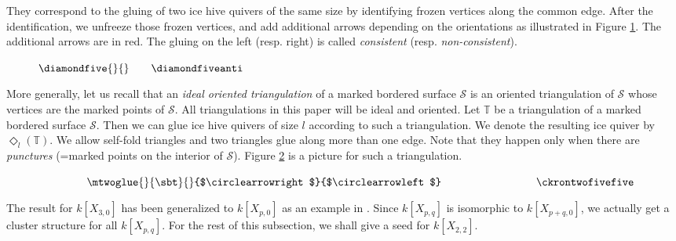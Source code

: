 \documentclass{amsart}
\theoremstyle{definition}
\theoremstyle{remark}
\numberwithin{equation}{section}
\newcommand{\mc}[1]{\mathcal{#1}}
\newcommand{\mb}[1]{\mathbb{#1}}
\begin{document}
\noindent They correspond to the gluing of two ice hive quivers of the same size by identifying frozen vertices along the common edge.
After the identification, we unfreeze those frozen vertices, and add additional arrows depending on the orientations as illustrated in Figure \ref{f:Pair}.
The additional arrows are in red. The gluing on the left (resp. right) is called {\em consistent} (resp. {\em non-consistent}).
\begin{figure}[!h] $\diamondfive{}{} \qquad  \diamondfiveanti$ \caption{} \label{f:Pair} \end{figure}

More generally, let us recall that an {\em ideal oriented triangulation} of a marked bordered surface $\mc{S}$ is an oriented triangulation of $\mc{S}$ whose
vertices are the marked points of $\mc{S}$. All triangulations in this paper will be ideal and oriented.
Let $\mb{T}$ be a triangulation of a marked bordered surface $\mc{S}$.
Then we can glue ice hive quivers of size $l$ according to such a triangulation.
We denote the resulting ice quiver by $\Diamond_l(\mb{T})$.
We allow self-fold triangles and two triangles glue along more than one edge. 
Note that they happen only when there are {\em punctures} (=marked points on the interior of $\mc{S}$).
Figure \ref{f:twoglue} is a picture for such a triangulation.
\begin{figure}[!h] $\hspace{.6in} \mtwoglue{}{\sbt}{}{$\circlearrowright$}{$\circlearrowleft$} \hspace{1.2in} \ckrontwofivefive$ \caption{} \label{f:twoglue} \end{figure} 

The result for $k[X_{3,0}]$ has been generalized to $k[X_{p,0}]$ as an example in \cite{FW}.
Since $k[X_{p,q}]$ is isomorphic to $k[X_{p+q,0}]$, we actually get a cluster structure for all $k[X_{p,q}]$.
For the rest of this subsection, we shall give a seed for $k[X_{2,2}]$.
 
\end{document}
